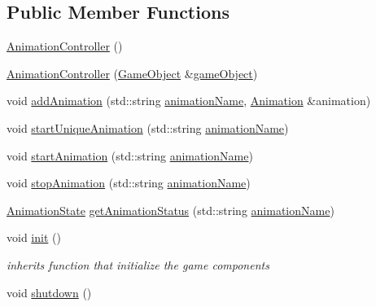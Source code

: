 \subsection*{Public Member Functions}
\begin{DoxyCompactItemize}
\item 
\hyperlink{classengine_1_1_animation_controller_a13976b0254122a71974b37ebc93b8526}{Animation\+Controller} ()
\item 
\hyperlink{classengine_1_1_animation_controller_ab56bec2905e143305453f2f2a88d0af8}{Animation\+Controller} (\hyperlink{classengine_1_1_game_object}{Game\+Object} \&\hyperlink{classengine_1_1_component_ad4a4865ca4df98ebea34d04a4ec5ad07}{game\+Object})
\item 
void \hyperlink{classengine_1_1_animation_controller_af52ba43bd14bb3cd912edd7a84afb3f9}{add\+Animation} (std\+::string \hyperlink{classengine_1_1_animation_a7db6aae9eef0e347e04af32b05a28476}{animation\+Name}, \hyperlink{classengine_1_1_animation}{Animation} \&animation)
\item 
void \hyperlink{classengine_1_1_animation_controller_af8950a96e4ac42fdab1d96bc79b951f4}{start\+Unique\+Animation} (std\+::string \hyperlink{classengine_1_1_animation_a7db6aae9eef0e347e04af32b05a28476}{animation\+Name})
\item 
void \hyperlink{classengine_1_1_animation_controller_ac0648702aa6724e46a4e377ae35221e1}{start\+Animation} (std\+::string \hyperlink{classengine_1_1_animation_a7db6aae9eef0e347e04af32b05a28476}{animation\+Name})
\item 
void \hyperlink{classengine_1_1_animation_controller_afc25ba59dc57193330399c491adff4bd}{stop\+Animation} (std\+::string \hyperlink{classengine_1_1_animation_a7db6aae9eef0e347e04af32b05a28476}{animation\+Name})
\item 
\hyperlink{namespaceengine_aa24807a1a7834d08efa99ae4672d3544}{Animation\+State} \hyperlink{classengine_1_1_animation_controller_a700251abe0a8f2145c84eb1d414f85c4}{get\+Animation\+Status} (std\+::string \hyperlink{classengine_1_1_animation_a7db6aae9eef0e347e04af32b05a28476}{animation\+Name})
\item 
void \hyperlink{classengine_1_1_animation_controller_ae40c2032604f044293d50c27da416f01}{init} ()
\begin{DoxyCompactList}\small\item\em inherits function that initialize the game components \end{DoxyCompactList}\item 
void \hyperlink{classengine_1_1_animation_controller_a63ed3b30c0ea1fba109e6bed452c21ce}{shutdown} ()

\end{DoxyCompactItemize}
